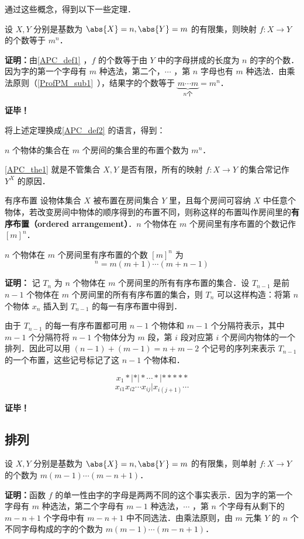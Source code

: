 通过这些概念，得到以下一些定理．

\begin{theorem}{}\label{APC_the1}
设 $X,Y$ 分别是基数为 $\abs{X}=n,\abs{Y}=m$ 的有限集，则映射 $f:X\rightarrow Y$ 的个数等于 $m^n$．
\end{theorem}
\textbf{证明：}由\autoref{APC_def1} ，$f$ 的个数等于由 $Y$ 中的字母拼成的长度为 $n$ 的字的个数．因为字的第一个字母有 $m$ 种选法，第二个，$\cdots$ ，第 $n$ 字母也有 $m$ 种选法．由乘法原则（\autoref{ProfPM_sub1}~），结果字的个数等于 $\underbrace{m\cdots m}_{n\text{个}}=m^n$．

\textbf{证毕！}

将上述定理换成\autoref{APC_def2} 的语言，得到：
\begin{theorem}{}
$n$ 个物体的集合在 $m$ 个房间的集合里的布置个数为 $m^n$．
\end{theorem}

\autoref{APC_the1} 就是不管集合 $X,Y$ 是否有限，所有的映射 $f:X\rightarrow Y$ 的集合常记作 $Y^X$ 的原因．

\begin{definition}{有序布置}
设物体集合 $X$ 被布置在房间集合 $Y$ 里，且每个房间可容纳 $X$ 中任意个物体，若改变房间中物体的顺序得到的布置不同，则称这样的布置叫作房间里的\textbf{有序布置（ordered arrangement）}．$n$ 个物体在 $m$ 个房间里有序布置的个数记作 $[m]^n$．
\end{definition}
\begin{theorem}{}
$n$ 个物体在 $m$ 个房间里有序布置的个数 $[m]^n$ 为
\begin{equation}
[m]^n=m(m+1)\cdots(m+n-1)
\end{equation}
\end{theorem}
\textbf{证明：}
记 $T_n$ 为 $n$ 个物体在 $m$ 个房间里的所有有序布置的集合．设 $T_{n-1}$ 是前 $n-1$ 个物体在 $m$ 个房间里的所有有序布置的集合，则 $T_n$ 可以这样构造：将第 $n$ 个物体 $x_n$ 插入到 $T_{n-1}$ 的每一有序布置中得到．

由于 $T_{n-1}$ 的每一有序布置都可用 $n-1$ 个物体和 $m-1$ 个分隔符表示，其中 $m-1$ 个分隔符将 $n-1$ 个物体分为 $m$ 段，第 $i$ 段对应第 $i$ 个房间内物体的一个排列．因此可以用 $(n-1)+(m-1)=n+m-2$ 个记号的序列来表示 $T_{n-1}$ 的一个布置，这些记号标记了这 $n-1$ 个物体和． 

\[
x_1*|*|*\cdots*|*****
\]
\begin{equation}
x_{i1}x_{i2}\cdots x_{ij}|x_{i(j+1)}\cdots
\end{equation}

\textbf{证毕！}
\subsection{排列}
\begin{theorem}{}
设 $X,Y$ 分别是基数为 $\abs{X}=n,\abs{Y}=m$ 的有限集，则单射 $f:X\rightarrow Y$ 的个数为 $m(m-1)\cdots(m-n+1)$．
\end{theorem}
\textbf{证明：}函数 $f$ 的单一性由字的字母是两两不同的这个事实表示．因为字的第一个字母有 $m$ 种选法，第二个字母有 $m-1$ 种选法，$\cdots$ ，第 $n$ 个字母有从剩下的 $m-n+1$ 个字母中有 $m-n+1$ 中不同选法．由乘法原则，由 $m$ 元集 $Y$ 的 $n$ 个不同字母构成的字的个数为 $m(m-1)\cdots(m-n+1)$．

